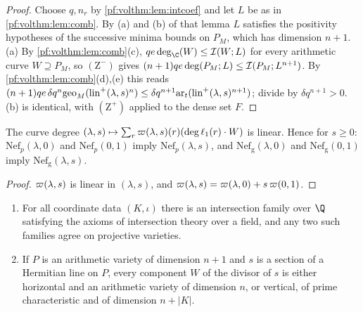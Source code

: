 \begin{proof}
Choose $q,n_r$ by \cref{pf:volthm:lem:intcoef} and let $L$ be as in \cref{pf:volthm:lem:comb}. By (a) and (b)
of that lemma $L$ satisfies the positivity hypotheses of the successive minima bounds on $P_M$, which has
dimension $n+1$. (a) By \cref{pf:volthm:lem:comb}(c), $qe\deg_\C(W)\le\volthmII(W;L)$ for every arithmetic
curve $W\supseteq P_M$, so $(\mathrm{Z}^-)$ gives
$(n+1)qe\deg(P_M;L)\le\mathcal{I}(P_M;L^{n+1})$. By \cref{pf:volthm:lem:comb}(d),(e) this reads
$(n+1)qe\,\delta q^n\mathrm{geo}_M(\mathrm{lin}^+(\lambda,s)^n)\le\delta q^{n+1}\mathrm{ar}_t(\mathrm{lin}^+(\lambda,s)^{n+1})$;
divide by $\delta q^{n+1}>0$. (b) is identical, with $(\mathrm{Z}^+)$ applied to the dense
set $F$.
\end{proof}

\begin{lemma}\label{pf:volthm:lem:nefcone}
The curve degree $(\lambda,s)\mapsto\sum_r\varpi(\lambda,s)(r)(\deg\ell_1(r)\cdot W)$ is linear.
Hence for $s\ge0$: $\mathrm{Nef}_p(\lambda,0)$ and $\mathrm{Nef}_p(0,1)$ imply $\mathrm{Nef}_p(\lambda,s)$, and
$\mathrm{Nef}_{\mathrm g}(\lambda,0)$ and $\mathrm{Nef}_{\mathrm g}(0,1)$ imply $\mathrm{Nef}_{\mathrm g}(\lambda,s)$.
\end{lemma}

\begin{proof}
$\varpi(\lambda,s)$ is linear in $(\lambda,s)$, and $\varpi(\lambda,s)=\varpi(\lambda,0)+s\,\varpi(0,1)$.
\end{proof}

\begin{lemma}\label{pf:volthm:lem:aux}
\begin{enumerate}[label=(\alph*)]
\item For all coordinate data $(K,\iota)$ there is an intersection family over $\Q$ satisfying the axioms of
  intersection theory over a field, and any two such families agree on projective varieties.
\item If $P$ is an arithmetic variety of dimension $n+1$ and $s$ is a section of a Hermitian line on $P$, every
  component $W$ of the divisor of $s$ is either horizontal and an arithmetic variety of dimension $n$, or
  vertical, of prime characteristic and of dimension $n+|K|$.
\end{enumerate}
\end{lemma}

